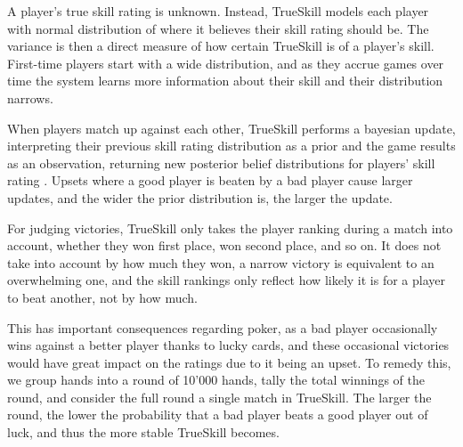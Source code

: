 A player's true skill rating is unknown. Instead, TrueSkill models each player with normal distribution of where it believes their skill rating should be. The variance is then a direct measure of how certain TrueSkill is of a player's skill. First-time players start with a wide distribution, and as they accrue games over time the system learns more information about their skill and their distribution narrows.

When players match up against each other, TrueSkill performs a bayesian update, interpreting their previous skill rating distribution as a prior and the game results as an observation, returning new posterior belief distributions for players' skill rating \cite{TrueSkill_original} \cite{TrueSkill_blog}. Upsets where a good player is beaten by a bad player cause larger updates, and the wider the prior distribution is, the larger the update.

For judging victories, TrueSkill only takes the player ranking during a match into account, whether they won first place, won second place, and so on. It does not take into account by how much they won, a narrow victory is equivalent to an overwhelming one, and the skill rankings only reflect how likely it is for a player to beat another, not by how much.

This has important consequences regarding poker, as a bad player occasionally wins against a better player thanks to lucky cards, and these occasional victories would have great impact on the ratings due to it being an upset. To remedy this, we group hands into a round of 10'000 hands, tally the total winnings of the round, and consider the full round a single match in TrueSkill. The larger the round, the lower the probability that a bad player beats a good player out of luck, and thus the more stable TrueSkill becomes.